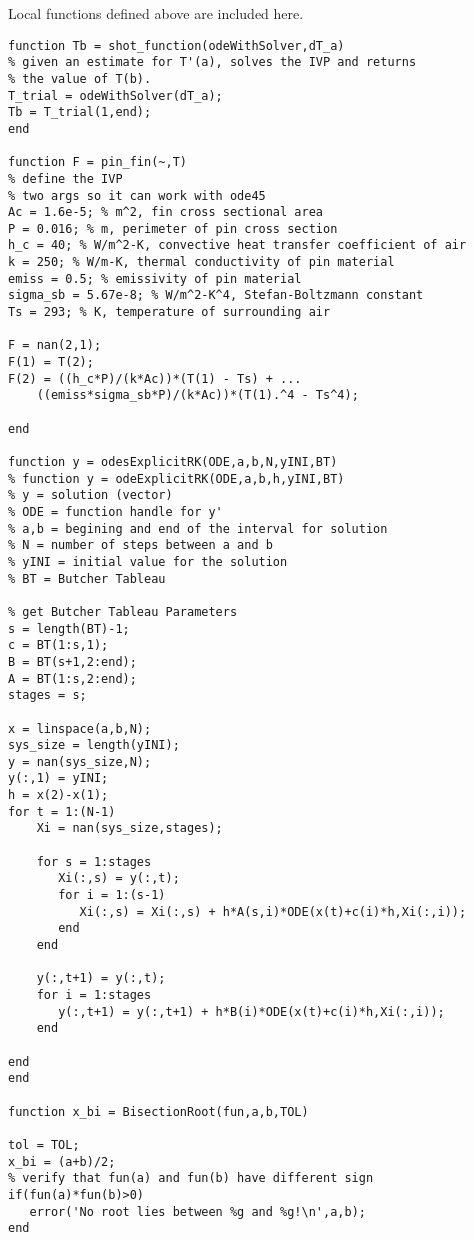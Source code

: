 Local functions defined above are included here.  %
\begin{lstlisting}[style=myMatlab,name=lec28n-ex1]
%% Local Functions
function Tb = shot_function(odeWithSolver,dT_a)
% given an estimate for T'(a), solves the IVP and returns
% the value of T(b).
T_trial = odeWithSolver(dT_a);
Tb = T_trial(1,end);
end

function F = pin_fin(~,T)
% define the IVP
% two args so it can work with ode45
Ac = 1.6e-5; % m^2, fin cross sectional area
P = 0.016; % m, perimeter of pin cross section
h_c = 40; % W/m^2-K, convective heat transfer coefficient of air
k = 250; % W/m-K, thermal conductivity of pin material
emiss = 0.5; % emissivity of pin material
sigma_sb = 5.67e-8; % W/m^2-K^4, Stefan-Boltzmann constant
Ts = 293; % K, temperature of surrounding air

F = nan(2,1);
F(1) = T(2);
F(2) = ((h_c*P)/(k*Ac))*(T(1) - Ts) + ...
    ((emiss*sigma_sb*P)/(k*Ac))*(T(1).^4 - Ts^4);

end

function y = odesExplicitRK(ODE,a,b,N,yINI,BT)
% function y = odeExplicitRK(ODE,a,b,h,yINI,BT)
% y = solution (vector)
% ODE = function handle for y'
% a,b = begining and end of the interval for solution
% N = number of steps between a and b
% yINI = initial value for the solution
% BT = Butcher Tableau

% get Butcher Tableau Parameters
s = length(BT)-1;
c = BT(1:s,1);
B = BT(s+1,2:end);
A = BT(1:s,2:end);
stages = s;

x = linspace(a,b,N);
sys_size = length(yINI);
y = nan(sys_size,N);
y(:,1) = yINI;
h = x(2)-x(1);
for t = 1:(N-1)
    Xi = nan(sys_size,stages);
    
    for s = 1:stages
       Xi(:,s) = y(:,t);
       for i = 1:(s-1)
          Xi(:,s) = Xi(:,s) + h*A(s,i)*ODE(x(t)+c(i)*h,Xi(:,i)); 
       end
    end
    
    y(:,t+1) = y(:,t);
    for i = 1:stages
       y(:,t+1) = y(:,t+1) + h*B(i)*ODE(x(t)+c(i)*h,Xi(:,i)); 
    end
    
end
end

function x_bi = BisectionRoot(fun,a,b,TOL)

tol = TOL;
x_bi = (a+b)/2;
% verify that fun(a) and fun(b) have different sign
if(fun(a)*fun(b)>0)
   error('No root lies between %g and %g!\n',a,b); 
end


\end{lstlisting}

